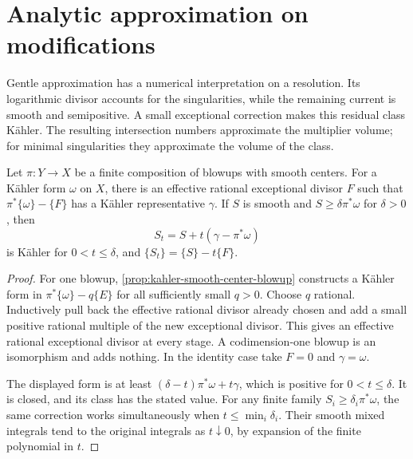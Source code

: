 \section{Analytic approximation on modifications}
\label{sec:analytic-volume-approximation}
Gentle approximation has a numerical interpretation on a resolution. Its logarithmic divisor accounts for the singularities, while the remaining current is smooth and semipositive. A small exceptional correction makes this residual class K\"ahler. The resulting intersection numbers approximate the multiplier volume; for minimal singularities they approximate the volume of the class.

\begin{lemma}\label{lem:exceptional-kahler-correction}
Let $\pi:Y\to X$ be a finite composition of blowups with smooth centers. For a K\"ahler form $\omega$ on $X$, there is an effective rational exceptional divisor $F$ such that $\pi^*\{\omega\}-\{F\}$ has a K\"ahler representative $\gamma$. If $S$ is smooth and $S\geq\delta\pi^*\omega$ for $\delta>0$, then
\[
 S_t=S+t(\gamma-\pi^*\omega)
\]
is K\"ahler for $0<t\leq\delta$, and $\{S_t\}=\{S\}-t\{F\}$.
\end{lemma}
\begin{proof}
For one blowup, \cref{prop:kahler-smooth-center-blowup} constructs a K\"ahler form in $\pi^*\{\omega\}-q\{E\}$ for all sufficiently small $q>0$. Choose $q$ rational. Inductively pull back the effective rational divisor already chosen and add a small positive rational multiple of the new exceptional divisor. This gives an effective rational exceptional divisor at every stage. A codimension-one blowup is an isomorphism and adds nothing. In the identity case take $F=0$ and $\gamma=\omega$.

The displayed form is at least $(\delta-t)\pi^*\omega+t\gamma$, which is positive for $0<t\leq\delta$. It is closed, and its class has the stated value. For any finite family $S_i\geq\delta_i\pi^*\omega$, the same correction works simultaneously when $t\leq\min_i\delta_i$. Their smooth mixed integrals tend to the original integrals as $t\downarrow0$, by expansion of the finite polynomial in $t$.
\end{proof}

